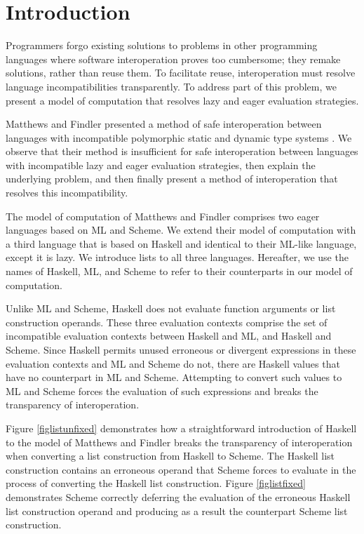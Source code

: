 \chapter{Introduction}

Programmers forgo existing solutions to problems in other programming languages where software interoperation proves too cumbersome; they remake solutions, rather than reuse them. To facilitate reuse, interoperation must resolve language incompatibilities transparently. To address part of this problem, we present a model of computation that resolves lazy and eager evaluation strategies.

Matthews and Findler presented a method of safe interoperation between languages with incompatible polymorphic static and dynamic type systems \cite{matthews07}. We observe that their method is insufficient for safe interoperation between languages with incompatible lazy and eager evaluation strategies, then explain the underlying problem, and then finally present a method of interoperation that resolves this incompatibility.

The model of computation of Matthews and Findler comprises two eager languages based on ML and Scheme. We extend their model of computation with a third language that is based on Haskell and identical to their ML-like language, except it is lazy. We introduce lists to all three languages. Hereafter, we use the names of Haskell, ML, and Scheme to refer to their counterparts in our model of computation.

Unlike ML and Scheme, Haskell does not evaluate function arguments or list construction operands. These three evaluation contexts comprise the set of incompatible evaluation contexts between Haskell and ML, and Haskell and Scheme. Since Haskell permits unused erroneous or divergent expressions in these evaluation contexts and ML and Scheme do not, there are Haskell values that have no counterpart in ML and Scheme. Attempting to convert such values to ML and Scheme forces the evaluation of such expressions and breaks the transparency of interoperation.

Figure \ref{figlistunfixed} demonstrates how a straightforward introduction of Haskell to the model of Matthews and Findler breaks the transparency of interoperation when converting a list construction from Haskell to Scheme. The Haskell list construction contains an erroneous operand that Scheme forces to evaluate in the process of converting the Haskell list construction. Figure \ref{figlistfixed} demonstrates Scheme correctly deferring the evaluation of the erroneous Haskell list construction operand and producing as a result the counterpart Scheme list construction.

